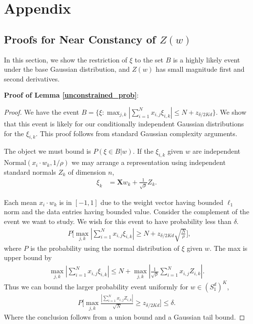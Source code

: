 \documentclass{article}
\numberwithin{equation}{section}
\theoremstyle{Lemma}
\theoremstyle{Corollary}
\theoremstyle{Theorem}
\theoremstyle{Remark}
\begin{document}
\section{Appendix}

\subsection{\textbf{Proofs for Near Constancy of $Z(w)$}}\label{app_phi_pfs}
In this section, we show the restriction of $\xi$ to the set $B$ is a highly likely event under the base Gaussian distribution, and $Z(w)$ has small magnitude first and second derivatives.

\vspace{0.2cm}
\textbf{Proof of Lemma \ref{unconstrained_prob}}:
\begin{proof}
    We have the event $B=\{\xi: \max_{j,k}|\sum_{i=1}^{N} x_{i,j}\xi_{i,k}| \leq N+z_{\delta/2Kd}\}$. We show that this event is likely for our conditionally independent Gaussian distributions for the $\xi_{i,k}$. This proof follows from standard Gaussian complexity arguments.
    
    The object we must bound is $P(\xi \in B|w)$. If the $\xi_{i,k}$ given $w$ are independent $\text{Normal}(x_{i}\cdot w_{k},1/\rho)$ we may arrange a representation using independent standard normals $Z_{k}$ of dimension $n$,
\begin{align}
    \xi_{k}&= \textbf{X} w_{k}+\frac{1}{\sqrt{\rho}}Z_{k}.
\end{align}

Each mean $x_{i} \cdot w_{k}$ is in $[-1,1]$ due to the weight vector having bounded $\ell_{1}$ norm and the data entries having bounded value.
Consider the complement of the event we want to study. We wish for this event to have probability less than $\delta$.
\begin{align}
    &P\Big[\max_{j,k}|\sum_{i=1}^{N} x_{i,j}\xi_{i,k}| \geq N+z_{\delta/2Kd} \sqrt{\frac{N}{\rho}}\Big],\label{orig_event}
\end{align}
where $P$ is the probability using the normal distribution of $\xi$ given $w$. The max is upper bound by
\begin{align}
    \max_{j,k}|\sum_{i=1}^{N}x_{i,j}\xi_{i,k}| \leq N+\max_{j,k} |\frac{1}{\sqrt{\rho}}\sum_{i=1}^{N}x_{i,j}Z_{i,k}|.
\end{align}
Thus we can bound the larger probability event uniformly for $w \in (S^{d}_{1})^{K}$,
\begin{align}
    P\Big[\max_{j,k}\frac{|\sum_{i=1}^{N} x_{i,j}Z_{i,k}|}{\sqrt{N}} \geq z_{\delta/2Kd}\Big]\leq \delta.
\end{align}
Where the conclusion follows from a union bound and a Gaussian tail bound.
    
\end{proof}
\end{document}

